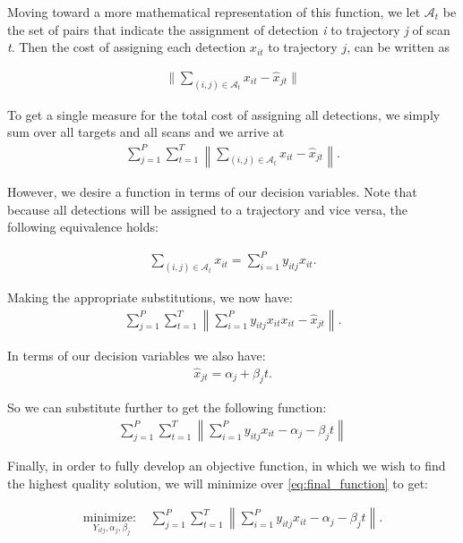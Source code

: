 Moving toward a more mathematical representation of this function, we let $\mathcal{A}_{t}$ be the set of pairs that indicate the assignment of detection \textit{i} to trajectory \textit{j} of scan \textit{t}. Then the cost of assigning each detection $x_{it}$ to trajectory $j$, can be written as

\begin{align}
\|\sum_{(i,j)\in \mathcal{A}_{t}} x_{it} - \hat{x}_{jt}\| 
\end{align} 

To get a single measure for the total cost of assigning all detections, we simply sum over all targets and all scans and we arrive at
\begin{align}
\sum_{j=1}^{P} \sum_{t=1}^{T}  \left \|\sum_{(i,j)\in \mathcal{A}_{t}} x_{it} - \hat{x}_{jt}\right \|. 
\end{align}

However, we desire a function in terms of our decision variables. Note that because all detections will be assigned to a trajectory and vice versa, the following equivalence holds:

\begin{align}
\sum_{(i,j)\in \mathcal{A}_{t}} x_{it} = \sum_{i=1}^{P}y_{itj}x_{it}.
\end{align}

Making the appropriate substitutions, we now have:
\begin{align}
 \sum_{j=1}^{P} \sum_{t=1}^{T}  \left \| \sum_{i=1}^{P}y_{itj}x_{it} x_{it} - \hat{x}_{jt} \right \|. 
\end{align}

In terms of our decision variables we also have:
\begin{align}
	\hat{x}_{jt} =  \alpha_{j} + \beta_{j}t.
\end{align}

So we can substitute further to get the following function:
\begin{align}\label{eq:final_function}
\sum_{j=1}^{P} \sum_{t=1}^{T}  \left\| \sum_{i=1}^{P}y_{itj}x_{it} - \alpha_{j} - \beta_{j}t\right\| 
\end{align}

Finally, in order to fully develop an objective function, in which we wish to find the highest quality solution, we will minimize over \eqref{eq:final_function} to get:

\begin{align}\label{eq:full_objective}
\underset{Y_{itj}, \alpha_{j}, \beta_{j}}{\text{minimize: }} &  \sum_{j=1}^{P} \sum_{t=1}^{T}  \left \| \sum_{i=1}^{P}y_{itj}x_{it} -  \alpha_{j} - \beta_{j}t \right \|. 
\end{align}

